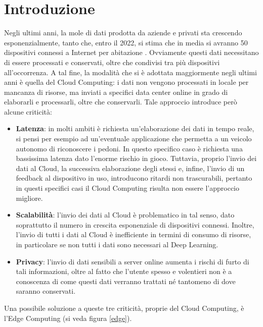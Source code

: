 \chapter{Introduzione}
Negli ultimi anni, la mole di dati prodotta da aziende e privati sta crescendo esponenzialmente, tanto che, entro il 2022, si stima che in media si avranno 50 dispositivi connessi a Internet per abitazione \cite{iotedge}. Ovviamente questi dati necessitano di essere processati e conservati, oltre che condivisi tra più dispositivi all'occorrenza. A tal fine, la modalità che si è adottata maggiormente negli ultimi anni è quella del Cloud Computing: i dati non vengono processati in locale per mancanza di risorse, ma inviati a specifici data center online in grado di elaborarli e processarli, oltre che conservarli. Tale approccio introduce però alcune criticità:

\begin{itemize}
	\item \textbf{Latenza}: in molti ambiti è richiesta un'elaborazione dei dati in tempo reale, si pensi per esempio ad un'eventuale applicazione che permetta a un veicolo autonomo di riconoscere i pedoni. In questo specifico caso è richiesta una bassissima latenza dato l'enorme rischio in gioco. Tuttavia, proprio l'invio dei dati al Cloud, la successiva elaborazione degli stessi e, infine, l'invio di un feedback al dispositivo in uso, introducono ritardi non trascurabili, pertanto in questi specifici casi il Cloud Computing risulta non essere l'approccio migliore.
	\item \textbf{Scalabilità}: l'invio dei dati al Cloud è problematico in tal senso, dato soprattutto il numero in crescita esponenziale di dispositivi connessi. Inoltre, l'invio di tutti i dati al Cloud è inefficiente in termini di consumo di risorse, in particolare se non tutti i dati sono necessari al Deep Learning.
	\item \textbf{Privacy}: l'invio di dati sensibili a server online aumenta i rischi di furto di tali informazioni, oltre al fatto che l'utente spesso e volentieri non è a conoscenza di come questi dati verranno trattati né tantomeno di dove saranno conservati.
\end{itemize}

Una possibile soluzione a queste tre criticità, proprie del Cloud Computing, è l'Edge Computing (si veda figura \ref{edge}). 

